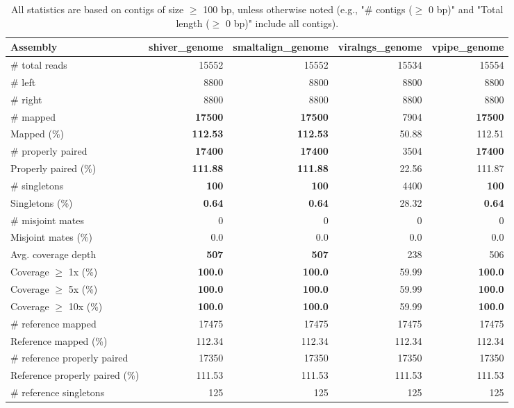 \documentclass[12pt,a4paper]{article}
\begin{document}
\begin{table}[ht]
\begin{center}
\caption{All statistics are based on contigs of size $\geq$ 100 bp, unless otherwise noted (e.g., "\# contigs ($\geq$ 0 bp)" and "Total length ($\geq$ 0 bp)" include all contigs).}
\begin{tabular}{|l*{4}{|r}|}
\hline
Assembly & shiver\_genome & smaltalign\_genome & viralngs\_genome & vpipe\_genome \\ \hline
\# total reads & 15552 & 15552 & 15534 & 15554 \\ \hline
\# left & 8800 & 8800 & 8800 & 8800 \\ \hline
\# right & 8800 & 8800 & 8800 & 8800 \\ \hline
\# mapped & {\bf 17500} & {\bf 17500} & 7904 & {\bf 17500} \\ \hline
Mapped (\%) & {\bf 112.53} & {\bf 112.53} & 50.88 & 112.51 \\ \hline
\# properly paired & {\bf 17400} & {\bf 17400} & 3504 & {\bf 17400} \\ \hline
Properly paired (\%) & {\bf 111.88} & {\bf 111.88} & 22.56 & 111.87 \\ \hline
\# singletons & {\bf 100} & {\bf 100} & 4400 & {\bf 100} \\ \hline
Singletons (\%) & {\bf 0.64} & {\bf 0.64} & 28.32 & {\bf 0.64} \\ \hline
\# misjoint mates & 0 & 0 & 0 & 0 \\ \hline
Misjoint mates (\%) & 0.0 & 0.0 & 0.0 & 0.0 \\ \hline
Avg. coverage depth & {\bf 507} & {\bf 507} & 238 & 506 \\ \hline
Coverage $\geq$ 1x (\%) & {\bf 100.0} & {\bf 100.0} & 59.99 & {\bf 100.0} \\ \hline
Coverage $\geq$ 5x (\%) & {\bf 100.0} & {\bf 100.0} & 59.99 & {\bf 100.0} \\ \hline
Coverage $\geq$ 10x (\%) & {\bf 100.0} & {\bf 100.0} & 59.99 & {\bf 100.0} \\ \hline
\# reference mapped & 17475 & 17475 & 17475 & 17475 \\ \hline
Reference mapped (\%) & 112.34 & 112.34 & 112.34 & 112.34 \\ \hline
\# reference properly paired & 17350 & 17350 & 17350 & 17350 \\ \hline
Reference properly paired (\%) & 111.53 & 111.53 & 111.53 & 111.53 \\ \hline
\# reference singletons & 125 & 125 & 125 & 125 \\ \hline

\end{tabular}
\end{center}
\end{table}
\end{document}
